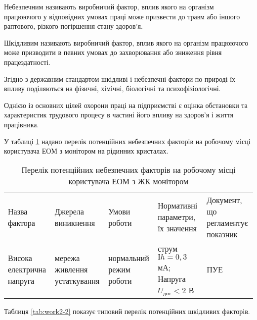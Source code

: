 Небезпечним називають виробничий фактор, вплив якого на організм працюючого у відповідних умовах праці може призвести до травм або іншого раптового, різкого погіршення стану здоров’я.

Шкідливим називають виробничий фактор, вплив якого на організм працюючого може призводити в певних умовах до захворювання або зниження рівня працездатності.

Згідно з державним стандартом шкідливі і небезпечні фактори по природі їх впливу поділяються на фізичні, хімічні, біологічні та психофізіологічні.

Однією із основних цілей охорони праці на підприємстві є оцінка обстановки та характеристик трудового процесу в частині його впливу на здоров’я і життя працівника.

У таблиці \ref{tab:work2-1} надано перелік потенційних небезпечних факторів на робочому місці користувача ЕОМ з монітором на рідинних кристалах.

\begin{table}[hbt]
	\captionstyle{ \raggedright}
	\caption{Перелік потенційних небезпечних факторів на робочому місці користувача ЕОМ з ЖК монітором}\label{tab:work2-1}
	\begin{tabular}{|m{}|m{}|m{}|m{}|m{}|}
		\hline
		Назва фактора& Джерела виникнення& Умови роботи& Нормативні параметри, їх значення & Документ, що регламентує показник \\
		\hlinewd{2pt}
		Висока електрична напруга & мережа живлення устаткування & нормальний режим роботи & струм $Іh = 0,3$ мА; Напруга $U_\text{дот} < 2$ В & ПУЕ \\ [8em]
		\hline
	\end{tabular}
\end{table}

Таблиця \ref{tab:work2-2} показує типовий перелік потенційних шкідливих факторів.

\newpage

